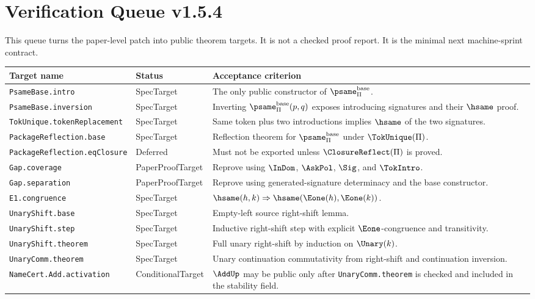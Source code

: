 
\chapter{Verification Queue v1.5.4}
\label{ch:v154-verification-queue}

This queue turns the paper-level patch into public theorem targets. It is not a checked proof report. It is the minimal next machine-sprint contract.

\begin{longtable}{p{}p{}p{}}
\toprule
\textbf{Target name} & \textbf{Status} & \textbf{Acceptance criterion}\\
\midrule
\texttt{PsameBase.intro} & SpecTarget & The only public constructor of \(\psame_{\Pi}^{\mathrm{base}}\).\\
\texttt{PsameBase.inversion} & SpecTarget & Inverting \(\psame_{\Pi}^{\mathrm{base}}(p,q)\) exposes introducing signatures and their \(\hsame\) proof.\\
\texttt{TokUnique.tokenReplacement} & SpecTarget & Same token plus two introductions implies \(\hsame\) of the two signatures.\\
\texttt{PackageReflection.base} & SpecTarget & Reflection theorem for \(\psame_{\Pi}^{\mathrm{base}}\) under \(\TokUnique(\Pi)\).\\
\texttt{PackageReflection.eqClosure} & Deferred & Must not be exported unless \(\ClosureReflect(\Pi)\) is proved.\\
\texttt{Gap.coverage} & PaperProofTarget & Reprove using \(\InDom\), \(\AskPol\), \(\Sig\), and \(\TokIntro\).\\
\texttt{Gap.separation} & PaperProofTarget & Reprove using generated-signature determinacy and the base constructor.\\
\texttt{E1.congruence} & SpecTarget & \(\hsame(h,k)\Rightarrow\hsame(\Eone(h),\Eone(k))\).\\
\texttt{UnaryShift.base} & SpecTarget & Empty-left source right-shift lemma.\\
\texttt{UnaryShift.step} & SpecTarget & Inductive right-shift step with explicit \(\Eone\)-congruence and transitivity.\\
\texttt{UnaryShift.theorem} & SpecTarget & Full unary right-shift by induction on \(\Unary(k)\).\\
\texttt{UnaryComm.theorem} & SpecTarget & Unary continuation commutativity from right-shift and continuation inversion.\\
\texttt{NameCert.Add.activation} & ConditionalTarget & \(\AddUp\) may be public only after \texttt{UnaryComm.theorem} is checked and included in the stability field.\\
\bottomrule
\end{longtable}


